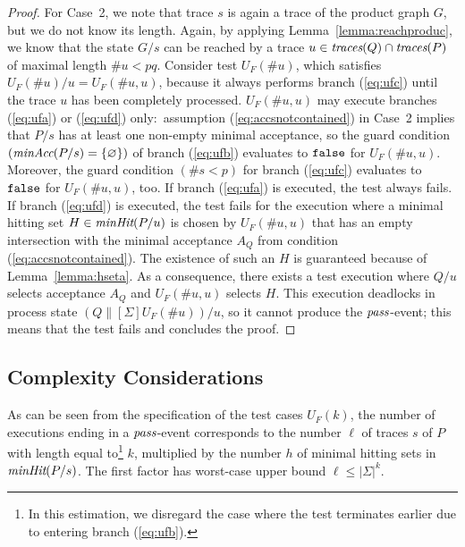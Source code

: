 \begin{proof}
For   Case~2, we note that trace $s$ is again a trace of the product graph
$G$, but we do not know its length. Again, by applying Lemma~\ref{lemma:reachproduc},
we know that the state   $G/s$ can   be reached by a trace
$u\in\text{\it traces}(Q)\cap\text{\it traces}(P)$ of maximal length $\#u < pq$. Consider test $U_F(\#
u)$, which satisfies $U_F(\# u)/u = U_F(\#u,u)$, because it always performs
branch (\ref{eq:ufc}) until the trace $u$ has been completely processed.
$U_F(\#u,u)$ may execute branches (\ref{eq:ufa}) or (\ref{eq:ufd})
only:~assumption (\ref{eq:accsnotcontained}) in Case~2 implies that $P/s$ has
at least one non-empty minimal acceptance, so the guard condition
$(\text{\it minAcc}(P/s) = \{ \varnothing \})$
of branch (\ref{eq:ufb}) evaluates to $\mbox{{\tt false}}$ for $U_F(\#u,u)$.
Moreover, the guard condition $(\#s < p)$ for branch (\ref{eq:ufc}) evaluates
to $\mbox{{\tt false}}$ for $U_F(\#u,u)$, too. If branch (\ref{eq:ufa}) is executed, the
test always fails. If branch (\ref{eq:ufd}) is executed, the test fails for
the execution where a minimal hitting set $H\in\text{\it minHit}(P/u)$ is chosen
by $U_F(\#u,u)$ that has an empty intersection with the minimal acceptance
$A_Q$ from condition (\ref{eq:accsnotcontained}). The existence of such an
$H$ is guaranteed because of Lemma~\ref{lemma:hseta}. As a consequence, there
exists a test execution   where $Q/u$ selects acceptance $A_Q$ and
$U_F(\#u,u)$ selects $H$. This execution deadlocks in process state
$(Q\parallel[\Sigma]U_F(\# u))/u$, so it cannot produce the ${\text{\it pass}}$-event;
this  means that the test fails and concludes the proof. \xbox
\end{proof}



\subsection{Complexity Considerations}
\label{sec:complexity}

As can be seen from the specification of the test cases $U_F(k)$, the number of
executions ending in a ${\text{\it pass}}$-event corresponds to the number $\ell$ of traces $s$
of $P$ with length equal to\footnote{In this estimation, we disregard
the case where the test
terminates earlier due to entering branch (\ref{eq:ufb}).} $k$,
multiplied by the number $h$ of minimal hitting sets in
$\text{\it minHit}(P/s)$. The first factor
has worst-case upper bound $\ell\le |\Sigma|^k$.

